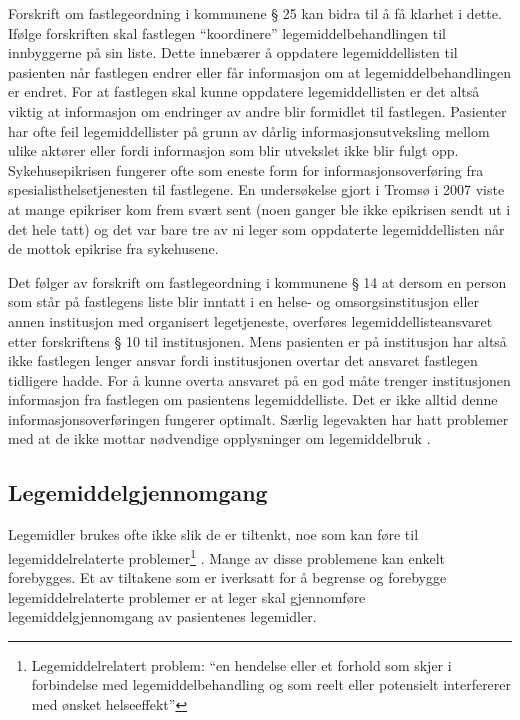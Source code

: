 Forskrift om fastlegeordning i kommunene § 25 kan bidra til å få klarhet i dette. Ifølge forskriften skal fastlegen “koordinere” legemiddelbehandlingen til innbyggerne på sin liste. Dette innebærer å oppdatere legemiddellisten til pasienten når fastlegen endrer eller får informasjon om at legemiddelbehandlingen er endret. For at fastlegen skal kunne oppdatere legemiddellisten er det altså viktig at informasjon om endringer av andre blir formidlet til fastlegen. Pasienter har ofte feil legemiddellister på grunn av dårlig informasjonsutveksling mellom ulike aktører eller fordi informasjon som blir utvekslet ikke blir fulgt opp. Sykehusepikrisen fungerer ofte som eneste form for informasjonsoverføring fra spesialisthelsetjenesten til fastlegene. En undersøkelse gjort i Tromsø \citep{komLegemidler} i 2007 viste at mange epikriser kom frem svært sent (noen ganger ble ikke epikrisen sendt ut i det hele tatt) og det var bare tre av ni leger som oppdaterte legemiddellisten når de mottok epikrise fra sykehusene.

Det følger av forskrift om fastlegeordning i kommunene § 14 at dersom en person som står på fastlegens liste blir inntatt i en helse- og omsorgsinstitusjon eller annen institusjon med organisert legetjeneste, overføres legemiddellisteansvaret etter forskriftens § 10 til institusjonen. Mens pasienten er på institusjon har altså ikke fastlegen lenger ansvar fordi institusjonen overtar det ansvaret fastlegen tidligere hadde. For å kunne overta ansvaret på en god måte trenger institusjonen informasjon fra fastlegen om pasientens legemiddelliste. Det er ikke alltid denne informasjonsoverføringen fungerer optimalt. Særlig legevakten har hatt problemer med at de ikke mottar nødvendige opplysninger om legemiddelbruk \citep{komLegemidler}. 

\subsection{Legemiddelgjennomgang} \label{subsec:legemiddelgjennomgang} 
Legemidler brukes ofte ikke slik de er tiltenkt, noe som kan føre til legemiddelrelaterte problemer\footnote{Legemiddelrelatert problem: “en hendelse eller et forhold som skjer i forbindelse med legemiddelbehandling og som reelt eller potensielt interfererer med ønsket helseeffekt”\citep{legemiddelgjennomgang}} \citep{WHO}. Mange av disse problemene kan enkelt forebygges. Et av tiltakene som er iverksatt for å begrense og forebygge legemiddelrelaterte problemer er at leger skal gjennomføre legemiddelgjennomgang av pasientenes legemidler. 

